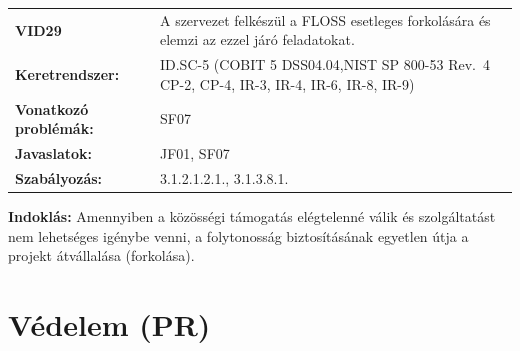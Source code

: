 \documentclass[12pt,magyar,a4paper,oneside]{scrreprt}
\begin{document}
\begin{longtable}[]{@{}ll@{}}
\toprule
\endhead
\begin{minipage}[t]{0.16\columnwidth}\raggedright
\textbf{VID29}\strut
\end{minipage} & \begin{minipage}[t]{0.79\columnwidth}\raggedright
A szervezet felkészül a FLOSS esetleges forkolására és elemzi az ezzel
járó feladatokat.\strut
\end{minipage}\tabularnewline
\begin{minipage}[t]{0.16\columnwidth}\raggedright
\textbf{Keretrendszer:}\strut
\end{minipage} & \begin{minipage}[t]{0.79\columnwidth}\raggedright
ID.SC-5 (COBIT 5 DSS04.04,NIST SP 800-53 Rev.~4 CP-2, CP-4, IR-3, IR-4,
IR-6, IR-8, IR-9)\strut
\end{minipage}\tabularnewline
\begin{minipage}[t]{0.16\columnwidth}\raggedright
\textbf{Vonatkozó problémák:}\strut
\end{minipage} & \begin{minipage}[t]{0.79\columnwidth}\raggedright
SF07\strut
\end{minipage}\tabularnewline
\begin{minipage}[t]{0.16\columnwidth}\raggedright
\textbf{Javaslatok:}\strut
\end{minipage} & \begin{minipage}[t]{0.79\columnwidth}\raggedright
JF01, SF07\strut
\end{minipage}\tabularnewline
\begin{minipage}[t]{0.16\columnwidth}\raggedright
\textbf{Szabályozás:}\strut
\end{minipage} & \begin{minipage}[t]{0.79\columnwidth}\raggedright
3.1.2.1.2.1., 3.1.3.8.1.\strut
\end{minipage}\tabularnewline
\bottomrule
\end{longtable}

\textbf{Indoklás: } Amennyiben a közösségi támogatás elégtelenné válik
és szolgáltatást nem lehetséges igénybe venni, a folytonosság
biztosításának egyetlen útja a projekt átvállalása (forkolása).

\hypertarget{vuxe9delem-pr}{%
\section{Védelem (PR)}\label{vuxe9delem-pr}}
\end{document}
